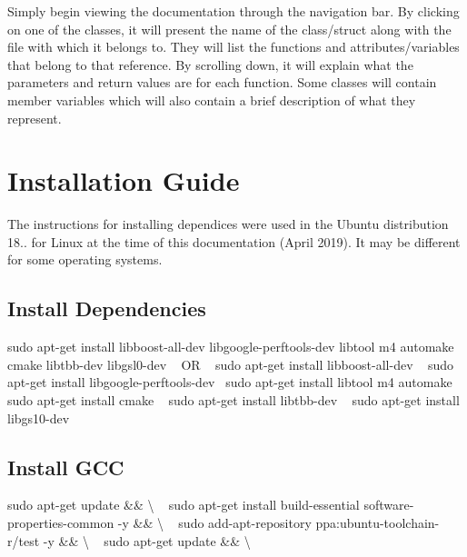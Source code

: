 Simply begin viewing the documentation through the navigation bar. By clicking on one of the classes, it will present the name of the class/struct along with the file with which it belongs to. They will list the functions and attributes/variables that belong to that reference. By scrolling down, it will explain what the parameters and return values are for each function. Some classes will contain member variables which will also contain a brief description of what they represent.\hypertarget{index_installation}{}\section{Installation Guide}\label{index_installation}
The instructions for installing dependices were used in the Ubuntu distribution 18.. for Linux at the time of this documentation (April 2019). It may be different for some operating systems.\hypertarget{index_step1}{}\subsection{Install Dependencies}\label{index_step1}
sudo apt-\/get install libboost-\/all-\/dev libgoogle-\/perftools-\/dev libtool m4 automake cmake libtbb-\/dev libgsl0-\/dev ~\newline
 OR ~\newline
 sudo apt-\/get install libboost-\/all-\/dev ~\newline
 sudo apt-\/get install libgoogle-\/perftools-\/dev~\newline
 sudo apt-\/get install libtool m4 automake~\newline
 sudo apt-\/get install cmake ~\newline
 sudo apt-\/get install libtbb-\/dev ~\newline
 sudo apt-\/get install libgs10-\/dev~\newline
\hypertarget{index_step2}{}\subsection{Install G\+CC}\label{index_step2}
sudo apt-\/get update \&\& \textbackslash{} ~\newline
 sudo apt-\/get install build-\/essential software-\/properties-\/common -\/y \&\& \textbackslash{} ~\newline
 sudo add-\/apt-\/repository ppa\+:ubuntu-\/toolchain-\/r/test -\/y \&\& \textbackslash{} ~\newline
 sudo apt-\/get update \&\& \textbackslash{} ~\newline
